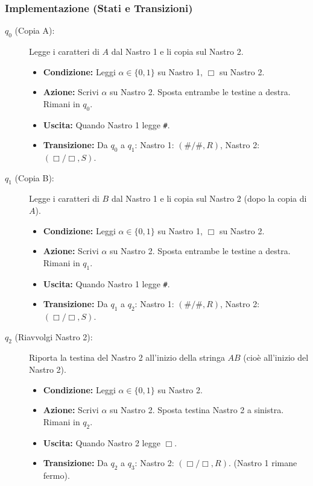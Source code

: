 \documentclass[a4paper, 11pt]{book} %
\theoremstyle{definition}
\begin{document}
\subsubsection{Implementazione (Stati e Transizioni)}
\begin{description}
    \item[$q_0$ (Copia A):] Legge i caratteri di $A$ dal Nastro 1 e li copia sul Nastro 2.
    \begin{itemize}
        \item \textbf{Condizione:} Leggi $\alpha \in \{0,1\}$ su Nastro 1, $\Box$ su Nastro 2.
        \item \textbf{Azione:} Scrivi $\alpha$ su Nastro 2. Sposta entrambe le testine a destra. Rimani in $q_0$.
        \item \textbf{Uscita:} Quando Nastro 1 legge \texttt{\#}.
        \item \textbf{Transizione:} Da $q_0$ a $q_1$: Nastro 1: $(\texttt{\#}/\texttt{\#}, R)$, Nastro 2: $(\Box/\Box, S)$.
    \end{itemize}
    \item[$q_1$ (Copia B):] Legge i caratteri di $B$ dal Nastro 1 e li copia sul Nastro 2 (dopo la copia di $A$).
    \begin{itemize}
        \item \textbf{Condizione:} Leggi $\alpha \in \{0,1\}$ su Nastro 1, $\Box$ su Nastro 2.
        \item \textbf{Azione:} Scrivi $\alpha$ su Nastro 2. Sposta entrambe le testine a destra. Rimani in $q_1$.
        \item \textbf{Uscita:} Quando Nastro 1 legge \texttt{\#}.
        \item \textbf{Transizione:} Da $q_1$ a $q_2$: Nastro 1: $(\texttt{\#}/\texttt{\#}, R)$, Nastro 2: $(\Box/\Box, S)$.
    \end{itemize}
    \item[$q_2$ (Riavvolgi Nastro 2):] Riporta la testina del Nastro 2 all'inizio della stringa $AB$ (cioè all'inizio del Nastro 2).
    \begin{itemize}
        \item \textbf{Condizione:} Leggi $\alpha \in \{0,1\}$ su Nastro 2.
        \item \textbf{Azione:} Scrivi $\alpha$ su Nastro 2. Sposta testina Nastro 2 a sinistra. Rimani in $q_2$.
        \item \textbf{Uscita:} Quando Nastro 2 legge $\Box$.
        \item \textbf{Transizione:} Da $q_2$ a $q_3$: Nastro 2: $(\Box/\Box, R)$. (Nastro 1 rimane fermo).

\end{itemize}
\end{description}
\end{document}
